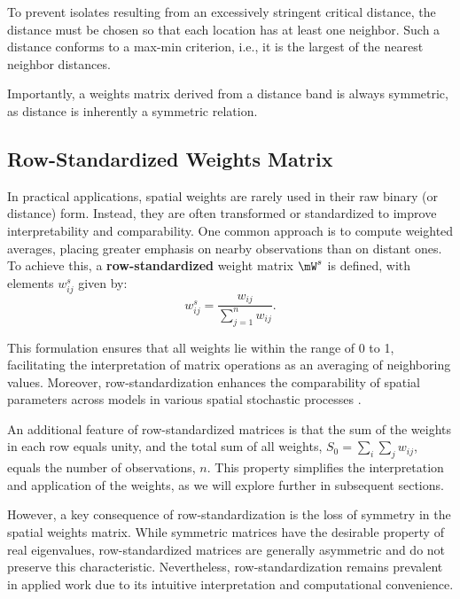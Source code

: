 To prevent isolates resulting from an excessively stringent critical distance, the distance must be chosen so that each location has at least one neighbor. Such a distance conforms to a max-min criterion, i.e., it is the largest of the nearest neighbor distances.

Importantly, a weights matrix derived from a distance band is always symmetric, as distance is inherently a symmetric relation.

\subsection{Row-Standardized Weights Matrix}

In practical applications, spatial weights are rarely used in their raw binary (or distance) form. Instead, they are often transformed or standardized to improve interpretability and comparability. One common approach is to compute weighted averages, placing greater emphasis on nearby observations than on distant ones. To achieve this, a \textbf{row-standardized} weight matrix $\mW^s$ is defined, with elements $w_{ij}^s$ given by:
\begin{equation*}
w_{ij}^s = \frac{w_{ij}}{\sum_{j = 1}^n w_{ij}}.
\end{equation*}

This formulation ensures that all weights lie within the range of 0 to 1, facilitating the interpretation of matrix operations as an averaging of neighboring values. Moreover, row-standardization enhances the comparability of spatial parameters across models in various spatial stochastic processes \citep{AnselinBera1998}.

An additional feature of row-standardized matrices is that the sum of the weights in each row equals unity, and the total sum of all weights, $S_0 = \sum_i\sum_j w_{ij}$, equals the number of observations, $n$. This property simplifies the interpretation and application of the weights, as we will explore further in subsequent sections.

However, a key consequence of row-standardization is the loss of symmetry in the spatial weights matrix. While symmetric matrices have the desirable property of real eigenvalues, row-standardized matrices are generally asymmetric and do not preserve this characteristic. Nevertheless, row-standardization remains prevalent in applied work due to its intuitive interpretation and computational convenience.

